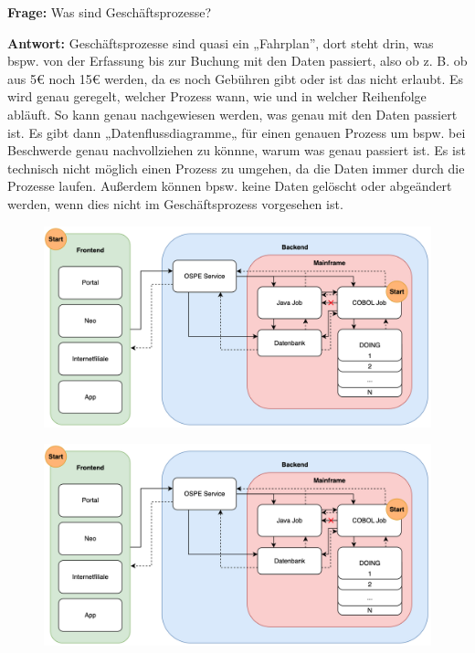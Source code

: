 \bigbreak
\bigbreak

\textbf{Frage:}
Was sind Geschäftsprozesse?


\textbf{Antwort:}
Geschäftsprozesse sind quasi ein „Fahrplan”, dort steht drin, was bspw. von der Erfassung bis zur Buchung mit den Daten passiert, also ob z. B. ob aus 5€ noch 15€ werden, da es noch Gebühren gibt oder ist das nicht erlaubt.
Es wird genau geregelt, welcher Prozess wann, wie und in welcher Reihenfolge abläuft.
So kann genau nachgewiesen werden, was genau mit den Daten passiert ist.
Es gibt dann „Datenflussdiagramme„ für einen genauen Prozess um bspw. bei Beschwerde genau nachvollziehen zu könnne, warum was genau passiert ist.
Es ist technisch nicht möglich einen Prozess zu umgehen, da die Daten immer durch die Prozesse laufen.
Außerdem können bpsw. keine Daten gelöscht oder abgeändert werden, wenn dies nicht im Geschäftsprozess vorgesehen ist.

\newpage

\begin{figure}[ht]
    \centering\includegraphics[width=1.0\textwidth]{Abbildungen/OSPlus-Diagramm.png}
\end{figure}

\begin{figure}[ht]
    \centering\includegraphics[width=1.0\textwidth]{Abbildungen/OSPlus-Diagramm.png}
\end{figure}

\newpage

\bigbreak